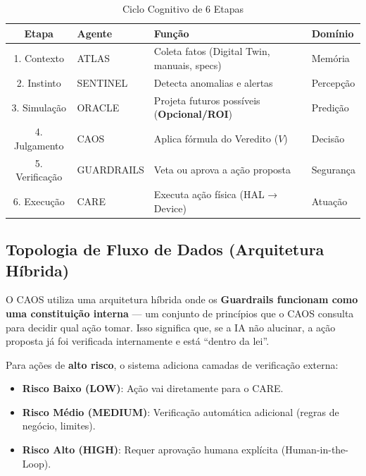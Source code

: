 \documentclass[12pt, a4paper]{article}
\begin{document}
\begin{table}[h!]
\centering
\small
\begin{tabular}{|c|l|l|l|}
\hline
\textbf{Etapa} & \textbf{Agente} & \textbf{Função} & \textbf{Domínio} \\ \hline
1. Contexto & ATLAS & Coleta fatos (Digital Twin, manuais, specs) & Memória \\ \hline
2. Instinto & SENTINEL & Detecta anomalias e alertas & Percepção \\ \hline
3. Simulação & ORACLE & Projeta futuros possíveis (\textbf{Opcional/ROI}) & Predição \\ \hline
4. Julgamento & CAOS & Aplica fórmula do Veredito ($V$) & Decisão \\ \hline
5. Verificação & GUARDRAILS & Veta ou aprova a ação proposta & Segurança \\ \hline
6. Execução & CARE & Executa ação física (HAL → Device) & Atuação \\ \hline
\end{tabular}
\caption{Ciclo Cognitivo de 6 Etapas}
\end{table}

\subsection{Topologia de Fluxo de Dados (Arquitetura Híbrida)}

O CAOS utiliza uma arquitetura híbrida onde os \textbf{Guardrails funcionam como uma constituição interna} — um conjunto de princípios que o CAOS consulta para decidir qual ação tomar. Isso significa que, se a IA não alucinar, a ação proposta já foi verificada internamente e está ``dentro da lei''.

Para ações de \textbf{alto risco}, o sistema adiciona camadas de verificação externa:
\begin{itemize}
    \item \textbf{Risco Baixo (LOW)}: Ação vai diretamente para o CARE.
    \item \textbf{Risco Médio (MEDIUM)}: Verificação automática adicional (regras de negócio, limites).
    \item \textbf{Risco Alto (HIGH)}: Requer aprovação humana explícita (Human-in-the-Loop).
\end{itemize}
\end{document}
